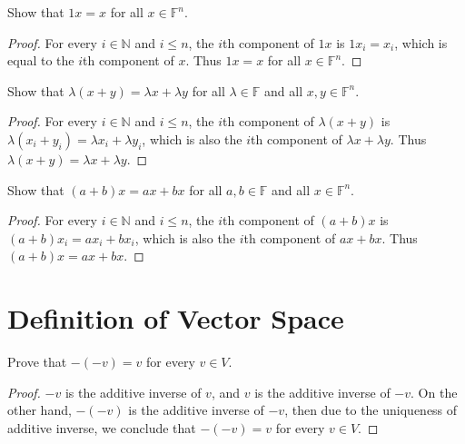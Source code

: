 \begin{exercise}
    Show that $1x = x$ for all $x\in\mathbb{F}^{n}$.
\end{exercise}

\begin{proof}
    For every $i\in\mathbb{N}$ and $i\leq n$, the $i$th component of $1x$ is $1x_{i} = x_{i}$, which is equal to the $i$th component of $x$. Thus $1x = x$ for all $x\in\mathbb{F}^{n}$.
\end{proof}

\begin{exercise}
    Show that $\lambda (x + y) = \lambda x + \lambda y$ for all $\lambda\in\mathbb{F}$ and all $x, y\in \mathbb{F}^{n}$.
\end{exercise}

\begin{proof}
    For every $i\in\mathbb{N}$ and $i\leq n$, the $i$th component of $\lambda (x + y)$ is $\lambda (x_{i} + y_{i}) = \lambda x_{i} + \lambda y_{i}$, which is also the $i$th component of $\lambda x + \lambda y$. Thus $\lambda (x + y) = \lambda x + \lambda y$.
\end{proof}

\begin{exercise}
    Show that $(a + b)x = ax + bx$ for all $a, b\in\mathbb{F}$ and all $x\in \mathbb{F}^{n}$.
\end{exercise}

\begin{proof}
    For every $i\in\mathbb{N}$ and $i\leq n$, the $i$th component of $(a + b)x$ is $(a + b)x_{i} = a x_{i} + b x_{i}$, which is also the $i$th component of $a x + b x$. Thus $(a + b)x = a x + b x$.
\end{proof}

\section{Definition of Vector Space}

\begin{exercise}
    Prove that $-(-v) = v$ for every $v\in V$.
\end{exercise}

\begin{proof}
    $-v$ is the additive inverse of $v$, and $v$ is the additive inverse of $-v$. On the other hand, $-(-v)$ is the additive inverse of $-v$, then due to the uniqueness of additive inverse, we conclude that $-(-v) = v$ for every $v\in V$.
\end{proof}

